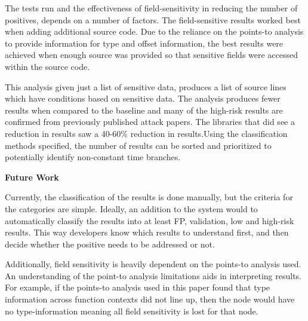    The tests run and the effectiveness of field-sensitivity in reducing the
   number of positives, depends on a number of factors. The field-sensitive
   results worked best when adding additional source code. Due to the reliance
   on the points-to analysis to provide information for type and offset
   information, the best results were achieved when enough source was provided
   so that sensitive fields were accessed within the source code. 
   
   This analysis given just a list of sensitive data, produces a list of source
   lines which have conditions based on sensitive data. The analysis produces
   fewer results when compared to the baseline and many of the high-risk results
   are confirmed from previously published attack papers. The libraries that did
   see a reduction in results saw a 40-60\% reduction in results.Using the
   classification methods specified, the number of results can be sorted and
   prioritized to potentially identify non-constant time branches.


   \noindent
   \textbf{Future Work}

   Currently, the classification of the results is done manually, but the
   criteria for the categories are simple. Ideally, an addition to the system
   would to automatically classify the results into at least FP, validation, low
   and high-risk results. This way developers know which results to understand
   first, and then decide whether the positive needs to be addressed or not.

   Additionally, field sensitivity is heavily dependent on the points-to
   analysis used. An understanding of the point-to analysis limitations aids in
   interpreting results. For example, if the points-to analysis used in this
   paper found that type information across function contexts did not line up,
   then the node would have no type-information meaning all field sensitivity is
   lost for that node.
